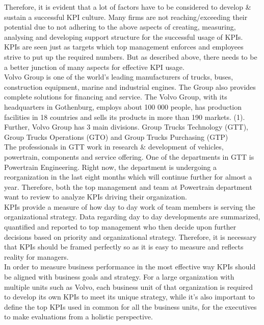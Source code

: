 Therefore, it is evident that a lot of factors have to be considered to develop & sustain a successful KPI culture. Many firms are not reaching/exceeding their potential due to not adhering to the above aspects of creating, measuring, analysing and developing support structure for the successful usage of KPIs. KPIs are seen just as targets which top management enforces and employees strive to put up the required numbers. But as described above, there needs to be a better junction of many aspects for effective KPI usage.\\

Volvo Group is one of the world’s leading manufacturers of trucks, buses, construction equipment, marine and industrial engines. The Group also provides complete solutions for financing and service. The Volvo Group, with its headquarters in Gothenburg, employs about 100 000 people, has production facilities in 18 countries and sells its products in more than 190 markets. (1). Further, Volvo Group has 3 main divisions. Group Trucks Technology (GTT), Group Trucks Operations (GTO) and Group Trucks Purchasing (GTP)\\ 

The professionals in GTT work in research & development of vehicles, powertrain, components and service offering. One of the departments in GTT is Powertrain Engineering. Right now, the department is undergoing a reorganization in the last eight months which will continue further for almost a year. Therefore, both the top management and team at Powertrain department want to review to analyze KPIs driving their organization.\\

KPIs provide a measure of how day to day work of team members is serving the organizational strategy. Data regarding day to day developments are summarized, quantified and reported to top management who then decide upon further decisions based on priority and organizational strategy. Therefore, it is necessary that KPIs should be framed perfectly so as it is easy to measure and reflects reality for managers.\\ 

In order to measure business performance in the most effective way KPIs should be aligned with business goals and strategy. For a large organization with multiple units such as Volvo, each business unit of that organization is required to develop its own KPIs to meet its unique strategy, while it’s also important to define the top KPIs used in common for all the business units, for the executives to make evaluations from a holistic perspective. \\

